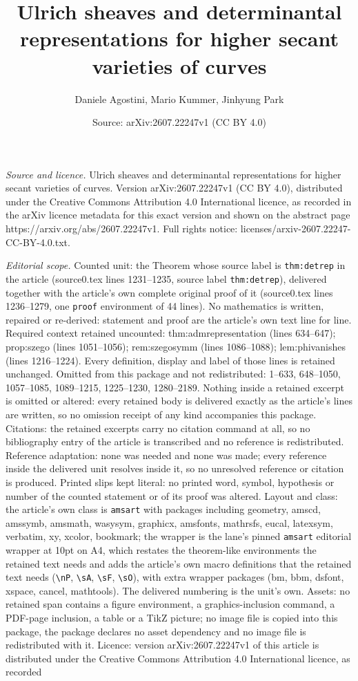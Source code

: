 \documentclass[10pt,a4paper]{amsart}
\title[Ulrich sheaves and determinantal representations for higher ]{Ulrich sheaves and determinantal representations for higher secant varieties of curves}
\author{Daniele Agostini, Mario Kummer, Jinhyung Park}
\date{Source: arXiv:2607.22247v1 (CC BY 4.0)}
\begin{document}
\maketitle

\noindent\emph{Source and licence.} Ulrich sheaves and determinantal representations for higher secant varieties of curves. Version arXiv:2607.22247v1 (CC BY 4.0), distributed under the Creative Commons Attribution 4.0 International licence, as recorded in the arXiv licence metadata for this exact version and shown on the abstract page https://arxiv.org/abs/2607.22247v1. Full rights notice: licenses/arxiv-2607.22247-CC-BY-4.0.txt.\par\smallskip

\noindent\textit{Editorial scope.} Counted unit: the Theorem whose source label is \texttt{thm:detrep} in the article (source0.tex lines 1231--1235, source label \texttt{thm:detrep}), delivered together with the article's own complete original proof of it (source0.tex lines 1236--1279, one \texttt{proof} environment of 44 lines). No mathematics is written, repaired or re-derived: statement and proof are the article's own text line for line. Required context retained uncounted: thm:admrepresentation (lines 634--647); prop:szego (lines 1051--1056); rem:szegosymm (lines 1086--1088); lem:phivanishes (lines 1216--1224). Every definition, display and label of those lines is retained unchanged. Omitted from this package and not redistributed: 1--633, 648--1050, 1057--1085, 1089--1215, 1225--1230, 1280--2189. Nothing inside a retained excerpt is omitted or altered: every retained body is delivered exactly as the article's lines are written, so no omission receipt of any kind accompanies this package. Citations: the retained excerpts carry no citation command at all, so no bibliography entry of the article is transcribed and no reference is redistributed. Reference adaptation: none was needed and none was made; every reference inside the delivered unit resolves inside it, so no unresolved reference or citation is produced. Printed slips kept literal: no printed word, symbol, hypothesis or number of the counted statement or of its proof was altered. Layout and class: the article's own class is \texttt{amsart} with packages including geometry, amscd, amssymb, amsmath, wasysym, graphicx, amsfonts, mathrsfs, eucal, latexsym, verbatim, xy, xcolor, bookmark; the wrapper is the lane's pinned \texttt{amsart} editorial wrapper at 10pt on A4, which restates the theorem-like environments the retained text needs and adds the article's own macro definitions that the retained text needs (\texttt{\textbackslash nP}, \texttt{\textbackslash sA}, \texttt{\textbackslash sF}, \texttt{\textbackslash sO}), with extra wrapper packages (bm, bbm, dsfont, xspace, cancel, mathtools). The delivered numbering is the unit's own. Assets: no retained span contains a figure environment, a graphics-inclusion command, a PDF-page inclusion, a table or a TikZ picture; no image file is copied into this package, the package declares no asset dependency and no image file is redistributed with it. Licence: version arXiv:2607.22247v1 of this article is distributed under the Creative Commons Attribution 4.0 International licence, as recorded 
\end{document}
